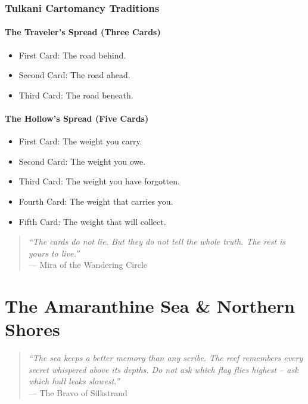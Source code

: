 \documentclass[12pt,oneside]{book}
\begin{document}
\section*{Tulkani Cartomancy Traditions}

\subsection*{The Traveler's Spread (Three Cards)}
\begin{itemize}
    \item First Card: The road behind.
    \item Second Card: The road ahead.
    \item Third Card: The road beneath.
\end{itemize}

\subsection*{The Hollow's Spread (Five Cards)}
\begin{itemize}
    \item First Card: The weight you carry.
    \item Second Card: The weight you owe.
    \item Third Card: The weight you have forgotten.
    \item Fourth Card: The weight that carries you.
    \item Fifth Card: The weight that will collect.
\end{itemize}

\begin{quote}
\textit{``The cards do not lie. But they do not tell the whole truth. The rest is yours to live.''}\\
\hfill --- Mira of the Wandering Circle
\end{quote}

\part{The Amaranthine Sea \& Northern Shores}

\begin{quote}
  \small
  \textit{``The sea keeps a better memory than any scribe. The reef remembers every secret whispered above its depths. Do not ask which flag flies highest -- ask which hull leaks slowest.''}
  \\ --- The Bravo of Silkstrand
\end{quote}
\end{document}
